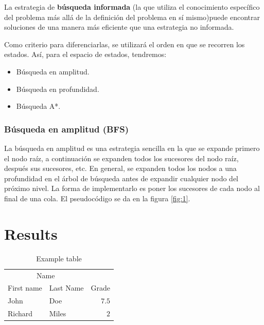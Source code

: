 \documentclass[twoside,twocolumn]{article}
\begin{document}
La estrategia de \textbf{búsqueda informada} (la que utiliza el
conocimiento específico del problema más allá de la definición del problema en sí mismo)puede encontrar soluciones de una manera más eficiente que una estrategia no informada.

\noindent
Como criterio para diferenciarlas, se utilizará el orden en que se recorren los estados. Así, para el espacio de estados, tendremos:

\begin{itemize}
    \item Búsqueda en amplitud.
    \item Búsqueda en profundidad.
    \item Búsqueda A*.
\end{itemize}


\subsubsection{Búsqueda en amplitud (BFS)}

La búsqueda en amplitud es una estrategia sencilla en la que se expande primero el nodo raíz, a continuación se expanden todos los sucesores del nodo raíz, después sus sucesores, etc. En general, se expanden todos los nodos a una profundidad en el árbol de búsqueda antes de expandir cualquier nodo del próximo nivel. La forma de implementarlo es poner los sucesores de cada nodo al final de una cola. El pseudocódigo se da en la figura \ref{fig:1}.





\section{Results}

\begin{table}
\caption{Example table}
\centering
	\begin{tabular}{llr}
	\toprule
	\multicolumn{2}{c}{Name} \\
	\cmidrule(r){1-2}
	First name & Last Name & Grade \\
	\midrule
	John & Doe & $7.5$ \\
	Richard & Miles & $2$ \\
	\bottomrule
	\end{tabular}
\end{table}
\end{document}
